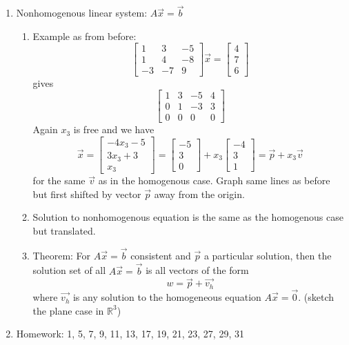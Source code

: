 \documentclass{article}
\begin{document}
\begin{enumerate}
\begin{enumerate}
\end{enumerate}

\item Nonhomogenous linear system: $A\vec{x} = \vec{b}$
\begin{enumerate}
\item Example as from before:
\[
\left[
\begin{array}{ccc}
1 & 3 & -5 \\
1 & 4 & -8 \\
-3 & -7 & 9 
\end{array}
\right]
\vec{x} = 
\left[
\begin{array}{c}
4 \\
7 \\
6 
\end{array}
\right]
\]
gives
\[
\left[
\begin{array}{ccc|c}
1 & 3 & -5 & 4 \\
0 & 1 & -3 & 3 \\
0 & 0 & 0 & 0
\end{array}
\right]
\]
Again $x_3$ is free and we have
\[
\vec{x} = \left[
\begin{array}{c}
-4x_3 - 5 \\
3x_3 + 3 \\
x_3
\end{array}
\right]
=  \left[
\begin{array}{c}
-5 \\
3 \\
0
\end{array}
\right] + 
x_3 \left[
\begin{array}{c}
-4 \\
3 \\
1
\end{array}
\right]
= \vec{p} + x_3 \vec{v}
\]
for the same $\vec{v}$ as in the homogenous case.
Graph same lines as before but first shifted by vector $\vec{p}$ away from the origin.

\item Solution to nonhomogenous equation is the same as the homogenous case but translated.

\item Theorem: For $A\vec{x} = \vec{b}$ consistent and $\vec{p}$ a particular solution, then the solution set of all $A\vec{x} = \vec{b}$ is all vectors of the form
\[
w = \vec{p} + \vec{v_h}
\]
where $\vec{v_h}$ is any solution to the homogeneous equation $A\vec{x} = \vec{0}$. (sketch the plane case in $\mathbb{R}^3$)

\end{enumerate}

\item Homework: 1, 5, 7, 9, 11, 13, 17, 19, 21, 23, 27, 29, 31

\end{enumerate}
\end{document}
